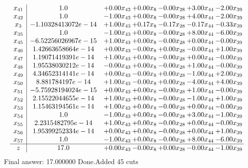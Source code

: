 \documentclass[8pt]{article}
\begin{document}
\[\begin{array}{c| c c@{\hskip 2pt} c@{\hskip 2pt} c@{\hskip 2pt} c@{\hskip 2pt} c@{\hskip 2pt} }
 x_{41}   &  1.0 & +  0.00 x_{43} & +  0.00 x_{8} & -0.00 x_{28} & +  3.00 x_{44} & -2.00 x_{39}\\
 x_{42}   &  1.0 & -1.00 x_{43} & +  0.00 x_{8} & -0.00 x_{28} & +  4.00 x_{44} & -2.00 x_{39}\\
 x_{3}   &  -1.10328413072e-14 & +  1.00 x_{43} & +  0.17 x_{8} & -0.17 x_{28} & -0.17 x_{44} & -0.33 x_{39}\\
 x_{35}   &  1.0 & -1.00 x_{43} & +  0.00 x_{8} & -0.00 x_{28} & +  8.00 x_{44} & -6.00 x_{39}\\
 x_{45}   &  -6.52256026967e-15 & +  1.00 x_{43} & +  0.00 x_{8} & -0.00 x_{28} & +  0.00 x_{44} & -0.00 x_{39}\\
 x_{46}   &  1.42663658664e-14 & +  0.00 x_{43} & -0.00 x_{8} & +  0.00 x_{28} & -0.00 x_{44} & +  1.00 x_{39}\\
 x_{47}   &  1.19071419391e-14 & +  1.00 x_{43} & +  0.00 x_{8} & -0.00 x_{28} & +  0.00 x_{44} & -0.00 x_{39}\\
 x_{48}   &  1.95538030212e-14 & -0.00 x_{43} & +  0.00 x_{8} & -0.00 x_{28} & +  1.00 x_{44} & -0.00 x_{39}\\
 x_{49}   &  4.34652314141e-14 & +  0.00 x_{43} & -0.00 x_{8} & +  0.00 x_{28} & -1.00 x_{44} & +  2.00 x_{39}\\
 x_{50}   &  8.881784197e-14 & +  1.00 x_{43} & -0.00 x_{8} & +  0.00 x_{28} & -4.00 x_{44} & +  4.00 x_{39}\\
 x_{51}   &  -5.75928194024e-15 & +  0.00 x_{43} & +  0.00 x_{8} & -0.00 x_{28} & +  1.00 x_{44} & -0.00 x_{39}\\
 x_{52}   &  2.15522044655e-14 & +  1.00 x_{43} & +  0.00 x_{8} & -0.00 x_{28} & -1.00 x_{44} & +  1.00 x_{39}\\
 x_{53}   &  1.15463194561e-14 & +  1.00 x_{43} & +  0.00 x_{8} & -0.00 x_{28} & +  0.00 x_{44} & -0.00 x_{39}\\
 x_{54}   &  1.0 & -1.00 x_{43} & +  0.00 x_{8} & -0.00 x_{28} & +  3.00 x_{44} & -1.00 x_{39}\\
 x_{55}   &  2.2315482795e-14 & +  1.00 x_{43} & +  0.00 x_{8} & -0.00 x_{28} & +  0.00 x_{44} & -0.00 x_{39}\\
 x_{56}   &  1.95399252334e-14 & +  0.00 x_{43} & +  0.00 x_{8} & -0.00 x_{28} & +  0.00 x_{44} & +  1.00 x_{39}\\
 x_{57}   &  1.0 & -1.00 x_{43} & +  0.00 x_{8} & -0.00 x_{28} & +  8.00 x_{44} & -6.00 x_{39}\\
\hline
z    &  17.0 & +  0.00 x_{43} & -0.00 x_{8} & +  0.00 x_{28} & -0.00 x_{44} & -1.00 x_{39}\\
\end{array}\]
 Final answer: 17.000000 
Done.Added 45 cuts 
\end{document}
